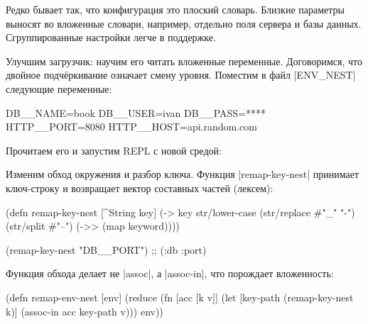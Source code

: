 Редко бывает так, что конфигурация это плоский словарь. Близкие параметры
выносят во вложенные словари, например, отдельно поля сервера и базы
данных. Сгруппированные настройки легче в поддержке.

Улучшим загрузчик: научим его читать вложенные переменные. Договоримся, что
двойное подч\"{е}ркивание означает смену уровня. Поместим в файл \spverb|ENV_NEST|
следующие переменные:

\begin{english}
  \begin{bash}
DB__NAME=book
DB__USER=ivan
DB__PASS=****
HTTP__PORT=8080
HTTP__HOST=api.random.com
  \end{bash}
\end{english}


\noindent
Прочитаем его и запустим REPL с новой средой:

\begin{english}
\end{english}

Изменим обход окружения и разбор ключа. Функция \spverb|remap-key-nest|
принимает ключ-строку и возвращает вектор составных частей (лексем):

\begin{english}
  \begin{clojure}
(defn remap-key-nest
  [^String key]
  (-> key
      str/lower-case
      (str/replace #"_" "-")
      (str/split #"--")
      (->> (map keyword))))

(remap-key-nest "DB__PORT")
;; (:db :port)
  \end{clojure}
\end{english}


Функция обхода делает не \spverb|assoc|, а \spverb|assoc-in|, что порождает
вложенность:

\begin{english}
  \begin{clojure}
(defn remap-env-nest
  [env]
  (reduce
   (fn [acc [k v]]
     (let [key-path (remap-key-nest k)]
       (assoc-in acc key-path v)))
   {}
   env))
  \end{clojure}
\end{english}

